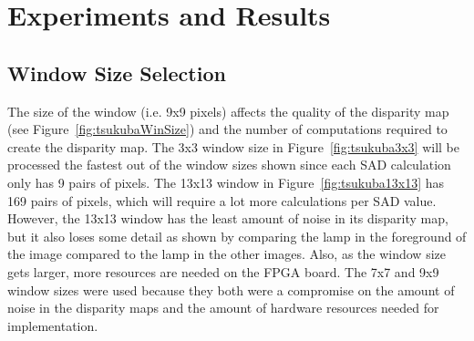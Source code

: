 \newcolumntype{+}{>{\global\let\currentrowstyle\relax}}
\newcolumntype{^}{>{\currentrowstyle}}
\newcommand{\rowstyle}[1]{\gdef\currentrowstyle{#1}%
#1\ignorespaces
}

\chapter{Experiments and Results}
\label{sec:impl}

\section{Window Size Selection}
\label{sec:windowSize}

The size of the window (i.e. 9x9 pixels) affects the quality of the disparity map (see Figure~\ref{fig:tsukubaWinSize}) and the number of computations required to create the disparity map. The 3x3 window size in Figure~\ref{fig:tsukuba3x3} will be processed the fastest out of the window sizes shown since each SAD calculation only has 9 pairs of pixels. The 13x13 window in Figure~\ref{fig:tsukuba13x13} has 169 pairs of pixels, which will require a lot more calculations per SAD value. However, the 13x13 window has the least amount of noise in its disparity map, but it also loses some detail as shown by comparing the lamp in the foreground of the image compared to the lamp in the other images. Also, as the window size gets larger, more resources are needed on the FPGA board. The 7x7 and 9x9 window sizes were used because they both were a compromise on the amount of noise in the disparity maps and the amount of hardware resources needed for implementation. 

